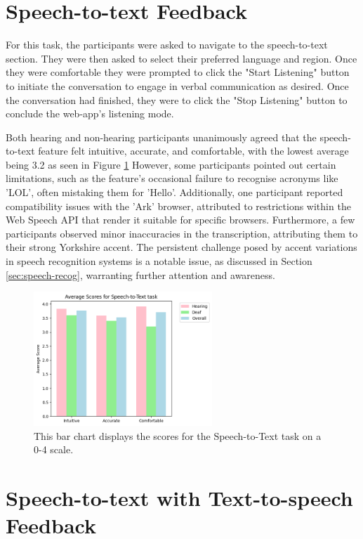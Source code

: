 \documentclass{l4proj}
\begin{document}
\section{Speech-to-text Feedback}

For this task, the participants were asked to navigate to the speech-to-text section. They were then asked to select their preferred language and region. Once they were comfortable they were prompted to click the "Start Listening" button to initiate the conversation to engage in verbal communication as desired. Once the conversation had finished, they were to click the "Stop Listening" button to conclude the web-app's listening mode.

Both hearing and non-hearing participants unanimously agreed that the speech-to-text feature felt intuitive, accurate, and comfortable, with the lowest average being 3.2 as seen in Figure \ref{fig:STT-chart} However, some participants pointed out certain limitations, such as the feature's occasional failure to recognise acronyms like 'LOL', often mistaking them for 'Hello'. Additionally, one participant reported compatibility issues with the 'Ark' browser, attributed to restrictions within the Web Speech API that render it suitable for specific browsers. Furthermore, a few participants observed minor inaccuracies in the transcription, attributing them to their strong Yorkshire accent. The persistent challenge posed by accent variations in speech recognition systems is a notable issue, as discussed in Section \ref{sec:speech-recog}, warranting further attention and awareness.

\begin{figure}
    \centering
    \includegraphics[width=0.6\textwidth]{dissertation/images/STT.png}
    \caption{This bar chart displays the scores for the Speech-to-Text task on a 0-4 scale.}
    \label{fig:STT-chart}
\end{figure}

\section{Speech-to-text with Text-to-speech Feedback}
\end{document}
